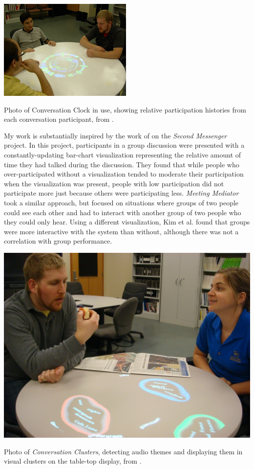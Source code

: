 \documentclass{tufte-handout}
\begin{document}
\begin{marginfigure}
	\includegraphics{figures/conversation_clock.png}
	\caption{Photo of Conversation Clock in use, showing relative participation histories from each conversation participant, from \citep{Bergstrom:2007je}.}
	\label{fig:conversation-clock}
\end{marginfigure}

My work is substantially inspired by the work of \citet{DiMicco:2007ie} on the \emph{Second Messenger} project. In this project, participants in a group discussion were presented with a constantly-updating bar-chart visualization representing the relative amount of time they had talked during the discussion. They found that while people who over-participated without a visualization tended to moderate their participation when the visualization was present, people with low participation did not participate more just because others were participating less. \emph{Meeting Mediator} \citep{Kim:2008ip} took a similar approach, but focused on situations where groups of two people could see each other and had to interact with another group of two people who they could only hear. Using a different visualization, Kim et al. found that groups were more interactive with the system than without, although there was not a correlation with group performance. 

\begin{marginfigure}
	\includegraphics{figures/conversation_clusters.jpg}
	\caption{Photo of \emph{Conversation Clusters}, detecting audio themes and displaying them in visual clusters on the table-top display, from  \citep{Bergstrom:2009fe}.}
	\label{fig:conversation-clusters}
\end{marginfigure}
\end{document}
